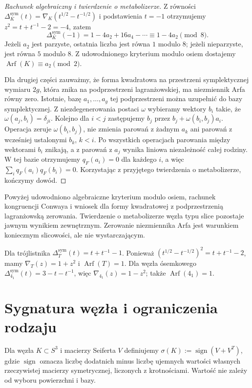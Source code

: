 \begin{proof}[Rachunek algebraiczny i twierdzenie o metabolizerze]
Z równości
$\Delta_K^{\mathrm{sym}}(t)=
\nabla_K(t^{1/2}-t^{-1/2})$
i podstawienia $t=-1$ otrzymujemy
$z^2=t+t^{-1}-2=-4$, zatem
\[
\Delta_K^{\mathrm{sym}}(-1)
=1-4a_2+16a_4-\cdots
\equiv1-4a_2\pmod8.
\]
Jeżeli $a_2$ jest parzyste, ostatnia liczba
jest równa $1$ modulo $8$;
jeżeli nieparzyste, jest równa $5$ modulo $8$.
Z udowodnionego kryterium modulo osiem dostajemy
$\operatorname{Arf}(K)\equiv a_2\pmod2$.

Dla drugiej części zauważmy, że forma
kwadratowa na przestrzeni symplektycznej
wymiaru $2g$, która znika na podprzestrzeni
lagranżowskiej, ma niezmiennik Arfa równy zero.
Istotnie, bazę $a_1,\ldots,a_g$ tej podprzestrzeni
można uzupełnić do bazy symplektycznej. Z niezdegenerowania
postaci $\omega$ wybieramy wektory $b_i$ takie, że
$\omega(a_j,b_i)=\delta_{ji}$. Kolejno dla $i<j$
zastępujemy $b_j$ przez $b_j+\omega(b_i,b_j)a_i$.
Operacja zeruje $\omega(b_i,b_j)$, nie zmienia parowań
z żadnym $a_k$ ani parowań z wcześniej ustalonymi
$b_k$, $k<i$. Po wszystkich operacjach parowania
między wektorami $b_i$ znikają, a z parowań z $a_j$
wynika liniowa niezależność całej rodziny.
W tej bazie otrzymujemy $q_F(a_i)=0$ dla każdego $i$,
a więc $\sum_iq_F(a_i)q_F(b_i)=0$.
Korzystając z przyjętego twierdzenia o metabolizerze,
kończymy dowód.
\end{proof}

\begin{uwaga}
Powyżej udowodniono algebraiczne kryterium modulo osiem,
rachunek kongruencji Conwaya i wniosek dla formy
kwadratowej z podprzestrzenią lagranżowską zerowania.
Twierdzenie o metabolizerze węzła typu slice
pozostaje jawnym wynikiem zewnętrznym.
Zerowanie niezmiennika Arfa jest warunkiem
koniecznym slicowości, ale nie wystarczającym.
\end{uwaga}

\begin{przyklad}
Dla trójlistnika
$\Delta_T^{\mathrm{sym}}(t)=t+t^{-1}-1$.
Ponieważ
$(t^{1/2}-t^{-1/2})^2=t+t^{-1}-2$,
mamy $\nabla_T(z)=1+z^2$ i
$\operatorname{Arf}(T)=1$.
Dla węzła ósemkowego
$\Delta_{4_1}^{\mathrm{sym}}(t)=3-t-t^{-1}$,
więc $\nabla_{4_1}(z)=1-z^2$;
także $\operatorname{Arf}(4_1)=1$.
\end{przyklad}


\section{Sygnatura węzła i ograniczenia rodzaju}
\label{sec:kt-sygnatura}

\begin{definicja}
Dla węzła $K\subset S^3$ i macierzy Seiferta $V$ definiujemy
$\sigma(K):=\operatorname{sign}(V+V^T)$,
gdzie $\operatorname{sign}$ oznacza liczbę dodatnich minus liczbę
ujemnych wartości własnych rzeczywistej macierzy symetrycznej,
liczonych z krotnościami. Wartość nie zależy od wyboru
powierzchni i bazy.
\end{definicja}

